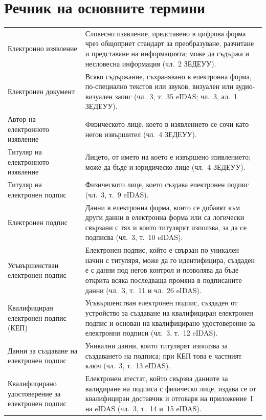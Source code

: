 \section*{Речник на основните термини}
\label{sec:rechnik}

{\small
\begin{longtable}{@{}T{4.1cm}L{12.45cm}@{}}
Електронно изявление & Словесно изявление, представено в цифрова форма чрез общоприет
стандарт за преобразуване, разчитане и представяне на информацията; може да съдържа и
несловесна информация (чл.~2 ЗЕДЕУУ).\\
Електронен документ & Всяко съдържание, съхранявано в електронна форма, по-специално
текстов или звуков, визуален или аудио-визуален запис (чл.~3, т.~35 eIDAS; чл.~3, ал.~1
ЗЕДЕУУ).\\
Автор на електронното изявление & Физическото лице, което в изявлението се сочи като негов
извършител (чл.~4 ЗЕДЕУУ).\\
Титуляр на електронното изявление & Лицето, от името на което е извършено изявлението;
може да бъде и юридическо лице (чл.~4 ЗЕДЕУУ).\\
Титуляр на електронен подпис & Физическото лице, което създава електронен подпис (чл.~3,
т.~9 eIDAS).\\
Електронен подпис & Данни в електронна форма, които се добавят към други данни в електронна
форма или са логически свързани с тях и които титулярят използва, за да се подписва
(чл.~3, т.~10 eIDAS).\\
Усъвършенстван електронен подпис & Електронен подпис, който е свързан по уникален начин с
титуляря, може да го идентифицира, създаден е с данни под негов контрол и позволява да
бъде открита всяка последваща промяна в подписаните данни (чл.~3, т.~11 и чл.~26 eIDAS).\\
Квалифициран електронен подпис (КЕП) & Усъвършенстван електронен подпис, създаден от
устройство за създаване на квалифициран електронен подпис и основан на квалифицирано
удостоверение за електронни подписи (чл.~3, т.~12 eIDAS).\\
Данни за създаване на електронен подпис & Уникални данни, които титулярят използва за
създаването на подписа; при КЕП това е частният ключ (чл.~3, т.~13 eIDAS).\\
Квалифицирано удостоверение за електронен подпис & Електронен атестат, който свързва
данните за валидиране на подписа с физическо лице, издава се от квалифициран доставчик и
отговаря на приложение~I на eIDAS (чл.~3, т.~14 и~15 eIDAS).\\

\end{longtable}}
